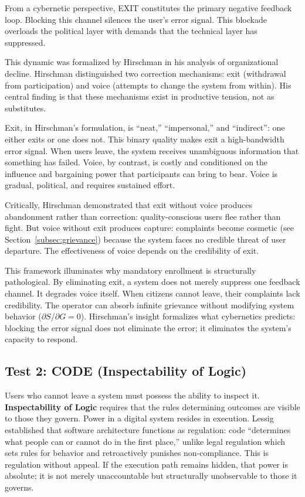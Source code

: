 \documentclass{article}
\begin{document}
From a cybernetic perspective, EXIT constitutes the primary negative feedback loop. Blocking this channel silences the user's error signal. This blockade overloads the political layer with demands that the technical layer has suppressed.

This dynamic was formalized by Hirschman \citep{hirschman1970} in his analysis of organizational decline. Hirschman distinguished two correction mechanisms: exit (withdrawal from participation) and voice (attempts to change the system from within). His central finding is that these mechanisms exist in productive tension, not as substitutes.

Exit, in Hirschman's formulation, is ``neat,'' ``impersonal,'' and ``indirect'': one either exits or one does not. This binary quality makes exit a high-bandwidth error signal. When users leave, the system receives unambiguous information that something has failed. Voice, by contrast, is costly and conditioned on the influence and bargaining power that participants can bring to bear. Voice is gradual, political, and requires sustained effort.

Critically, Hirschman demonstrated that exit without voice produces abandonment rather than correction: quality-conscious users flee rather than fight. But voice without exit produces capture: complaints become cosmetic (see Section~\ref{subsec:grievance}) because the system faces no credible threat of user departure. The effectiveness of voice depends on the credibility of exit.

This framework illuminates why mandatory enrollment is structurally pathological. By eliminating exit, a system does not merely suppress one feedback channel. It degrades voice itself. When citizens cannot leave, their complaints lack credibility. The operator can absorb infinite grievance without modifying system behavior ($\partial S / \partial G = 0$). Hirschman's insight formalizes what cybernetics predicts: blocking the error signal does not eliminate the error; it eliminates the system's capacity to respond.

\subsection{Test 2: CODE (Inspectability of Logic)}

Users who cannot leave a system must possess the ability to inspect it. \textbf{Inspectability of Logic} requires that the rules determining outcomes are visible to those they govern. Power in a digital system resides in execution. Lessig \citep{lessig2006} established that software architecture functions as regulation: code ``determines what people can or cannot do in the first place,'' unlike legal regulation which sets rules for behavior and retroactively punishes non-compliance. This is regulation without appeal. If the execution path remains hidden, that power is absolute; it is not merely unaccountable but structurally unobservable to those it governs.
\end{document}
